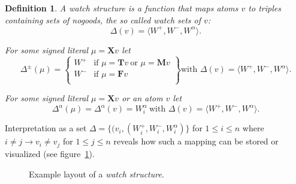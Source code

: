 \documentclass{vutinfth} %
\newtheorem{definition}{Definition}[section]
\newcommand{\bT}{\mathbf{T}}
\newcommand{\bM}{\mathbf{M}}
\newcommand{\bF}{\mathbf{F}}
\newcommand{\bX}{\mathbf{X}}
\newcommand{\dpm}{\Delta^\pm}
\newcommand{\dal}{\Delta^\alpha}
\newcommand{\sgl}{\mu}
\begin{document}
\begin{definition}
A \emph{watch structure} is a function that maps atoms $v$ to triples containing sets of nogoods, the so called \emph{watch sets} of $v$: $$\Delta(v) = \langle W^+, W^-, W^\alpha \rangle .$$


For some signed literal $\sgl = \bX v$ let $$\dpm(\sgl) = \left\{\begin{array}{ll}
        W^+ & \text{if } \sgl = \bT v \ \text{or } \sgl = \bM v\\
        W^- & \text{if } \sgl = \bF v \\
        \end{array}\right\} \text{with } \Delta(v) = \langle W^+, W^-, W^\alpha \rangle .$$

For some signed literal $\sgl = \bX v$ or an atom $v$ let $$\dal(\sgl) = \dal(v) = W_i^\alpha \ \text{with } \Delta(v) = \langle W^+, W^-, W^\alpha \rangle .$$
\end{definition}

Interpretation as a set $\Delta = \{(v_i, (W_i^+, W_i^-, W_i^\alpha)\}$ for $1 \leq i \leq n$ where $i \not = j \to v_i \not = v_j$ for $1 \leq j \leq n$ reveals how such a mapping can be stored or visualized (see figure~\ref{fig:watches}).

\begin{figure}[h]
  \centering
{}
  \caption{Example layout of a \emph{watch structure}.}
  \label{fig:watches} %
\end{figure}
\end{document}
